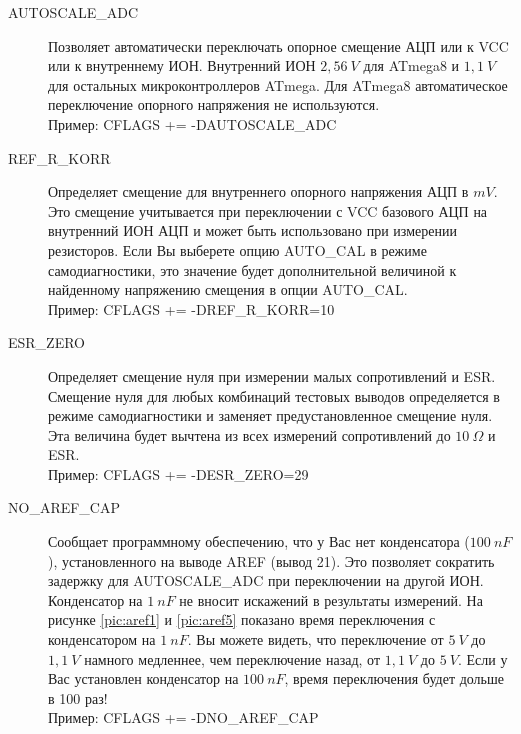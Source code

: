 \begin{description}
  \item[AUTOSCALE\_ADC] Позволяет автоматически переключать опорное смещение АЦП или к VCC или к внутреннему ИОН. 
Внутренний ИОН \(2,56~V\) для ATmega8 и \(1,1~V\) для остальных микроконтроллеров ATmega.
Для ATmega8 автоматическое переключение опорного напряжения не используются.\\
Пример: CFLAGS += -DAUTOSCALE\_ADC

  \item[REF\_R\_KORR] Определяет смещение для внутреннего опорного напряжения АЦП в \(mV\). Это смещение учитывается 
при переключении с VCC базового АЦП на внутренний ИОН АЦП и может быть использовано при измерении резисторов. 
Если Вы выберете опцию AUTO\_CAL в режиме самодиагностики, это значение будет дополнительной величиной к найденному 
напряжению смещения в  опции AUTO\_CAL.\\
Пример: CFLAGS += -DREF\_R\_KORR=10

  \item[ESR\_ZERO] Определяет смещение нуля при измерении малых сопротивлений и ESR.
Смещение нуля для любых комбинаций тестовых выводов определяется в режиме самодиагностики
и заменяет предустановленное смещение нуля.
Эта величина будет вычтена из всех измерений сопротивлений до \(10~\Omega\) и ESR.\\
Пример: CFLAGS += -DESR\_ZERO=29

  \item[NO\_AREF\_CAP] Сообщает программному обеспечению, что у Вас нет конденсатора (\(100~nF\)), установленного 
на выводе AREF (вывод 21). Это позволяет сократить задержку для AUTOSCALE\_ADC при переключении на другой ИОН. 
Конденсатор на \(1~nF\) не вносит искажений в результаты измерений. На рисунке \ref{pic:aref1} и \ref{pic:aref5} 
показано время переключения  с конденсатором на \(1~nF\).
Вы можете видеть, что переключение от \(5~V\) до \(1,1~V\) намного медленнее, чем переключение назад, от \(1,1~V\) 
до \(5~V\). 
Если у Вас установлен конденсатор на \(100~nF\), время переключения будет дольше в 100 раз!\\
Пример: CFLAGS += -DNO\_AREF\_CAP


\end{description}
